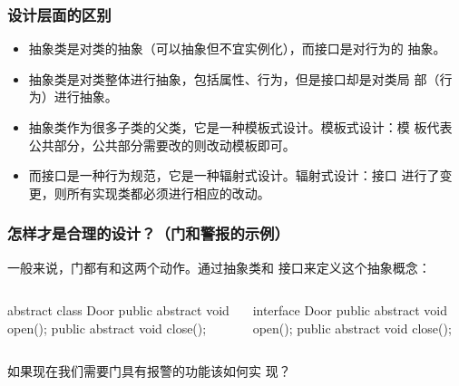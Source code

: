\begin{frame}[fragile]
  \frametitle{设计层面的区别}

  \begin{block}{}
    \begin{itemize}\kai
    \item 抽象类是对类的抽象（可以抽象但不宜实例化），而接口是对行为的
      抽象。
    \item 抽象类是对类整体进行抽象，包括属性、行为，但是接口却是对类局
      部（行为）进行抽象。
    \end{itemize}
  \end{block}

  \pause

  \begin{block}{}
    \begin{itemize}\kai
    \item 抽象类作为很多子类的父类，它是一种模板式设计。{\Red 模板式设计：模
      板代表公共部分，公共部分需要改的则改动模板即可。}
    \item 而接口是一种行为规范，它是一种辐射式设计。{\Red 辐射式设计：接口
      进行了变更，则所有实现类都必须进行相应的改动。}
    \end{itemize}
  \end{block}  

\end{frame}

\begin{frame}[fragile]
  \frametitle{怎样才是合理的设计？（门和警报的示例）}

  一般来说，门都有和这两个动作。通过抽象类和
  接口来定义这个抽象概念：

  \begin{columns}

    \begin{javaCode}
      abstract class Door {
        public abstract void open();
        public abstract void close();
      }
    \end{javaCode}


    \begin{javaCode}
      interface Door {
        public abstract void open();
        public abstract void close();
      }
    \end{javaCode}
  \end{columns}

  \pause
  
   如果现在我们需要门具有报警的功能该如何实
  现？
\end{frame}

